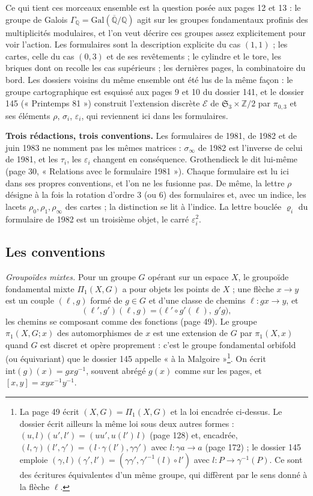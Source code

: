 \documentclass[11pt,a4paper]{article}
\begin{document}
Ce qui tient ces morceaux ensemble est la question posée aux pages 12 et 13 :
le groupe de Galois $\Gamma_{\mathbb{Q}} = \mathrm{Gal}(\overline{\mathbb{Q}}/\mathbb{Q})$
agit sur les groupes fondamentaux profinis des multiplicités modulaires, et
l'on veut décrire ces groupes assez explicitement pour voir l'action. Les
formulaires sont la description explicite du cas $(1,1)$ ; les cartes, celle
du cas $(0,3)$ et de ses revêtements ; le cylindre et le tore, les briques
dont on recolle les cas supérieurs ; les dernières pages, la combinatoire du
bord. Les dossiers voisins du même ensemble ont été lus de la même façon : le
groupe cartographique est esquissé aux pages 9 et 10 du dossier 141, et le
dossier 145 (« Printemps 81 ») construit l'extension discrète $\mathcal{E}$
de $\mathfrak{S}_3 \times \mathbb{Z}/2$ par $\pi_{0,3}$ et ses éléments
$\rho$, $\sigma_i$, $\varepsilon_i$, qui reviennent ici dans les
formulaires.

\textbf{Trois rédactions, trois conventions.} Les formulaires de 1981, de 1982
et de juin 1983 ne nomment pas les mêmes matrices : $\sigma_\infty$ de 1982 est
l'inverse de celui de 1981, et les $\tau_i$, les $\varepsilon_i$ changent en
conséquence. Grothendieck le dit lui-même (page 30, « Relations avec le
formulaire 1981 »). Chaque formulaire est lu ici dans ses propres conventions,
et l'on ne les fusionne pas. De même, la lettre $\rho$ désigne à la fois la
rotation d'ordre $3$ (ou $6$) des formulaires et, avec un indice, les lacets
$\rho_0, \rho_1, \rho_\infty$ des cartes ; la distinction se lit à l'indice.
La lettre bouclée $\varrho_i$ du formulaire de 1982 est un troisième objet,
le carré $\varepsilon_i^2$.

\subsection*{Les conventions}

\emph{Groupoïdes mixtes.} Pour un groupe $G$ opérant sur un espace $X$, le
groupoïde fondamental mixte $\Pi_1(X, G)$ a pour objets les points de $X$ ;
une flèche $x \to y$ est un couple $(\ell, g)$ formé de $g \in G$ et d'une
classe de chemins $\ell : gx \to y$, et
\[
(\ell', g')(\ell, g) = \bigl(\ell' \circ g'(\ell),\ g'g\bigr),
\]
les chemins se composant comme des fonctions (page 49). Le groupe
$\pi_1(X, G; x)$ des automorphismes de $x$ est une extension de $G$ par
$\pi_1(X, x)$ quand $G$ est discret et opère proprement : c'est le groupe
fondamental orbifold (ou équivariant) que le dossier 145 appelle
« à la Malgoire »\footnote{La page 49 écrit $(X, G) = \Pi_1(X, G)$ et la loi
encadrée ci-dessus. Le dossier écrit ailleurs la même loi sous deux autres
formes : $(u, l)(u', l') = (uu', u(l')\,l)$ (page 128) et, encadrée,
$(l, \gamma)(l', \gamma') = (l \cdot \gamma(l'), \gamma\gamma')$ avec
$l : \gamma a \to a$ (page 172) ; le dossier 145 emploie
$(\gamma, l)(\gamma', l') = (\gamma\gamma', \gamma'^{-1}(l) \circ l')$ avec
$l : P \to \gamma^{-1}(P)$. Ce sont des écritures équivalentes d'un même
groupe, qui diffèrent par le sens donné à la flèche $\ell$.}. On écrit
$\mathrm{int}(g)(x) = g x g^{-1}$, souvent abrégé $g(x)$ comme sur les pages,
et $[x, y] = x y x^{-1} y^{-1}$.
\end{document}
